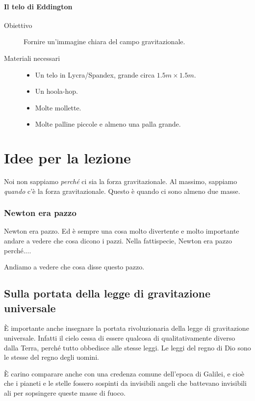 \documentclass[11pt]{report}
\begin{document}
\paragraph{Il telo di Eddington}
\begin{description}
    \item[Obiettivo] Fornire un'immagine chiara del campo gravitazionale.
    \item[Materiali necessari] 
    \begin{itemize}
        \item Un telo in Lycra/Spandex, grande circa $\SI{1.5} m \times \SI {1.5} m$. 
        \item Un hoola-hop.
        \item Molte mollette.
        \item Molte palline piccole e almeno una palla grande.
    \end{itemize}
\end{description}

\section*{Idee per la lezione}
Noi non sappiamo \emph{perché} ci sia la forza gravitazionale. Al massimo, sappiamo \emph{quando} c'è la forza gravitazionale. Questo è quando ci sono almeno due masse.

\subsubsection*{Newton era pazzo}
Newton era pazzo. Ed è sempre una cosa molto divertente e molto importante andare a vedere che cosa dicono i pazzi. Nella fattispecie, Newton era pazzo perché....

Andiamo a vedere che cosa disse questo pazzo.

\subsection*{Sulla portata della legge di gravitazione universale}
È importante anche insegnare la portata rivoluzionaria della legge di gravitazione universale. Infatti il cielo cessa di essere qualcosa di qualitativamente diverso dalla Terra, perché tutto obbedisce alle stesse leggi. Le leggi del regno di Dio sono le stesse del regno degli uomini.

 È carino comparare anche con una credenza comune dell'epoca di Galilei, e cioè che i pianeti e le stelle fossero sospinti da invisibili angeli che battevano invisibili ali per sopsingere queste masse di fuoco.
\end{document}
